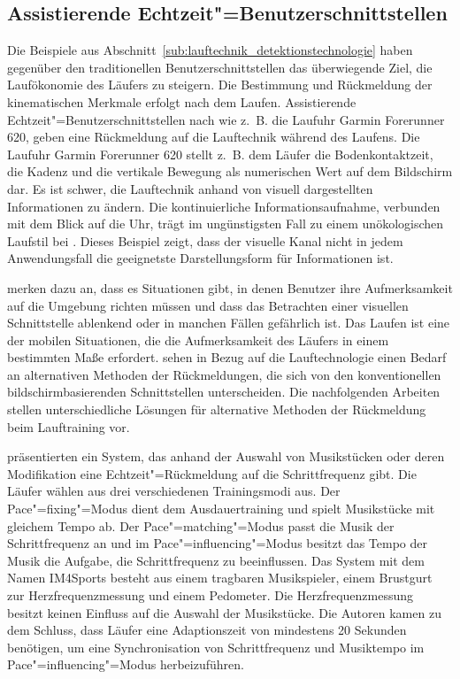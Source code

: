 \subsection{Assistierende Echtzeit"=Benutzerschnittstellen} 

\label{sub:assistierende_echtzeit_benutzerschnittstellen}

Die Beispiele aus Abschnitt~\ref{sub:lauftechnik_detektionstechnologie} haben gegenüber den traditionellen Benutzerschnittstellen das überwiegende Ziel, die Laufökonomie des Läufers zu steigern. Die Bestimmung und Rückmeldung der kinematischen Merkmale erfolgt nach dem Laufen. Assistierende Echtzeit"=Benutzerschnittstellen nach \citet{Jensen2014} wie z.~B. die Laufuhr Garmin Forerunner 620, geben eine Rückmeldung auf die Lauftechnik während des Laufens. Die Laufuhr Garmin Forerunner 620 stellt z.~B. dem Läufer die Bodenkontaktzeit, die Kadenz und die vertikale Bewegung als numerischen Wert auf dem Bildschirm dar. Es ist schwer, die Lauftechnik anhand von visuell dargestellten Informationen zu ändern. Die kontinuierliche Informationsaufnahme, verbunden mit dem Blick auf die Uhr, trägt im ungünstigsten Fall zu einem unökologischen Laufstil bei \citep{Jensen2014}. Dieses Beispiel zeigt, dass der visuelle Kanal nicht in jedem Anwendungsfall die geeignetste Darstellungsform für Informationen ist. 

\citet{Zhao2007} merken dazu an, dass es Situationen gibt, in denen Benutzer ihre Aufmerksamkeit auf die Umgebung richten müssen und dass das Betrachten einer visuellen Schnittstelle ablenkend oder in manchen Fällen gefährlich ist. Das Laufen ist eine der mobilen Situationen, die die Aufmerksamkeit des Läufers in einem bestimmten Maße erfordert. \citet{Jensen2014} sehen in Bezug auf die Lauftechnologie einen Bedarf an alternativen Methoden der Rückmeldungen, die sich von den konventionellen bildschirmbasierenden Schnittstellen unterscheiden. Die nachfolgenden Arbeiten stellen unterschiedliche Lösungen für alternative Methoden der Rückmeldung beim Lauftraining vor. 

\citet{Wijnalda2005} präsentierten ein System, das anhand der Auswahl von Musikstücken oder deren Modifikation eine Echtzeit"=Rückmeldung auf die Schrittfrequenz gibt. Die Läufer wählen aus drei verschiedenen Trainingsmodi aus. Der Pace"=fixing"=Modus dient dem Ausdauertraining und spielt Musikstücke mit gleichem Tempo ab. Der Pace"=matching"=Modus passt die Musik der Schrittfrequenz an und im Pace"=influencing"=Modus besitzt das Tempo der Musik die Aufgabe, die Schrittfrequenz zu beeinflussen. Das System mit dem Namen IM4Sports besteht aus einem tragbaren Musikspieler, einem Brustgurt zur Herzfrequenzmessung und einem Pedometer. Die Herzfrequenzmessung besitzt keinen Einfluss auf die Auswahl der Musikstücke. Die Autoren kamen zu dem Schluss, dass Läufer eine Adaptionszeit von mindestens 20 Sekunden benötigen, um eine Synchronisation von Schrittfrequenz und Musiktempo im Pace"=influencing"=Modus herbeizuführen.

